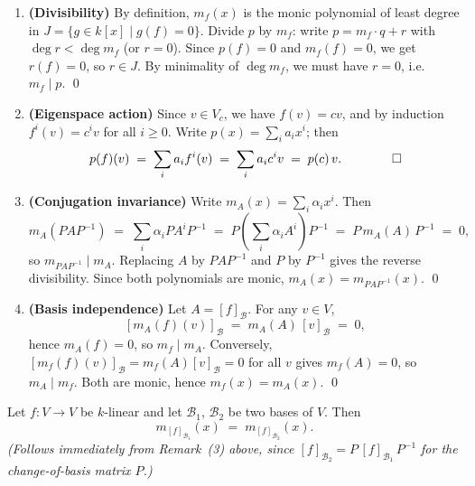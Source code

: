 \begin{proofbox}
\begin{enumerate}[leftmargin=1.5em, itemsep=6pt]
  \item \textbf{(Divisibility)}
        By definition, $m_f(x)$ is the monic polynomial of least degree in
        $J = \{g \in k[x] \mid g(f) = 0\}$.
        Divide $p$ by $m_f$: write $p = m_f \cdot q + r$ with $\deg r < \deg m_f$
        (or $r = 0$).  Since $p(f) = 0$ and $m_f(f) = 0$, we get $r(f) = 0$,
        so $r \in J$.  By minimality of $\deg m_f$, we must have $r = 0$,
        i.e.\ $m_f \mid p$. \qed

  \item \textbf{(Eigenspace action)}
        Since $v \in V_c$, we have $f(v) = cv$, and by induction
        $f^i(v) = c^i v$ for all $i \geq 0$.  Write $p(x) = \sum\limits_{i} a_i x^i$;
        then
        \[
          p(f)(v) \;=\; \sum\limits_{i} a_i f^i(v)
                   \;=\; \sum\limits_{i} a_i c^i v
                   \;=\; p(c)\,v. \qquad\qed
        \]

  \item \textbf{(Conjugation invariance)}
        Write $m_A(x) = \sum\limits_{i} \alpha_i x^i$.  Then
        \[
          m_A(PAP^{-1})
          \;=\; \sum\limits_{i} \alpha_i P A^i P^{-1}
          \;=\; P\!\left(\sum\limits_{i} \alpha_i A^i\right)\!P^{-1}
          \;=\; P\,m_A(A)\,P^{-1}
          \;=\; 0,
        \]
        so $m_{PAP^{-1}} \mid m_A$.  Replacing $A$ by $PAP^{-1}$ and $P$ by
        $P^{-1}$ gives the reverse divisibility.  Since both polynomials are
        monic, $m_A(x) = m_{PAP^{-1}}(x)$. \qed

  \item \textbf{(Basis independence)}
        Let $A = [f]_{\mathcal{B}}$.  For any $v \in V$,
        \[
          [m_A(f)(v)]_{\mathcal{B}}
          \;=\; m_A(A)\,[v]_{\mathcal{B}}
          \;=\; 0,
        \]
        hence $m_A(f) = 0$, so $m_f \mid m_A$.  Conversely,
        $[m_f(f)(v)]_{\mathcal{B}} = m_f(A)[v]_{\mathcal{B}} = 0$ for all $v$
        gives $m_f(A) = 0$, so $m_A \mid m_f$.
        Both are monic, hence $m_f(x) = m_A(x)$. \qed
\end{enumerate}
\end{proofbox}

\begin{corbox}
Let $f: V \to V$ be $k$-linear and let $\mathcal{B}_1$,
$\mathcal{B}_2$ be two bases of $V$.  Then
\[
  m_{[f]_{\mathcal{B}_1}}(x) \;=\; m_{[f]_{\mathcal{B}_2}}(x).
\]
\textit{(Follows immediately from Remark~(3) above, since
$[f]_{\mathcal{B}_2} = P\,[f]_{\mathcal{B}_1}\,P^{-1}$ for the
change-of-basis matrix $P$.)}
\end{corbox}

